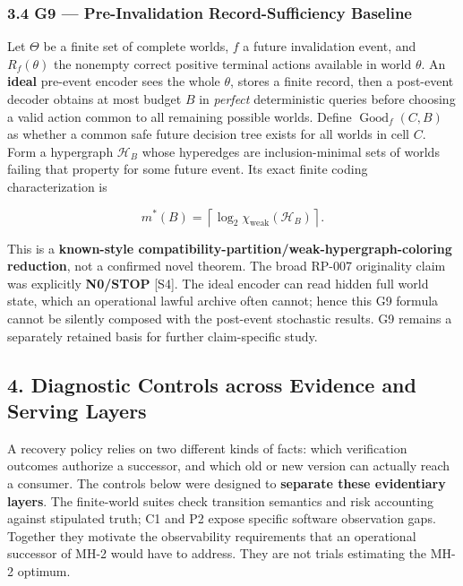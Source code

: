 \documentclass[
  10pt,
  american,
  a4paper,
]{article}
\begin{document}
\hypertarget{g9-pre-invalidation-record-sufficiency-baseline}{%
\subsubsection{3.4 G9 --- Pre-Invalidation Record-Sufficiency
Baseline}\label{g9-pre-invalidation-record-sufficiency-baseline}}

Let \(\Theta\) be a finite set of complete worlds, \(f\) a future
invalidation event, and \(R_f(\theta)\) the nonempty correct positive
terminal actions available in world \(\theta\). An \textbf{ideal}
pre-event encoder sees the whole \(\theta\), stores a finite record,
then a post-event decoder obtains at most budget \(B\) in \emph{perfect}
deterministic queries before choosing a valid action common to all
remaining possible worlds. Define \(\operatorname{Good}_f(C,B)\) as
whether a common safe future decision tree exists for all worlds in cell
\(C\). Form a hypergraph \(\mathcal H_B\) whose hyperedges are
inclusion-minimal sets of worlds failing that property for some future
event. Its exact finite coding characterization is

\[
 m^*(B)=\left\lceil\log_2\chi_{\mathrm{weak}}(\mathcal H_B)\right\rceil.
\]

This is a \textbf{known-style
compatibility-partition/weak-hypergraph-coloring reduction}, not a
confirmed novel theorem. The broad RP-007 originality claim was
explicitly \textbf{N0/STOP} {[}S4{]}. The ideal encoder can read hidden
full world state, which an operational lawful archive often cannot;
hence this G9 formula cannot be silently composed with the post-event
stochastic results. G9 remains a separately retained basis for further
claim-specific study.

\hypertarget{diagnostic-controls-across-evidence-and-serving-layers}{%
\subsection{4. Diagnostic Controls across Evidence and Serving
Layers}\label{diagnostic-controls-across-evidence-and-serving-layers}}

A recovery policy relies on two different kinds of facts: which
verification outcomes authorize a successor, and which old or new
version can actually reach a consumer. The controls below were designed
to \textbf{separate these evidentiary layers}. The finite-world suites
check transition semantics and risk accounting against stipulated truth;
C1 and P2 expose specific software observation gaps. Together they
motivate the observability requirements that an operational successor of
MH-2 would have to address. They are not trials estimating the MH-2
optimum.
\end{document}
